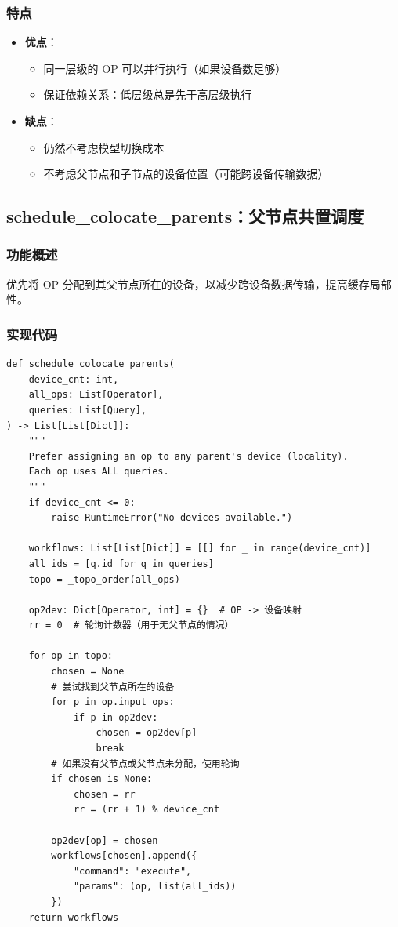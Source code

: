 \documentclass[12pt,a4paper]{article}
\begin{document}
\subsubsection{特点}

\begin{itemize}
    \item \textbf{优点}：
    \begin{itemize}
        \item 同一层级的 OP 可以并行执行（如果设备数足够）
        \item 保证依赖关系：低层级总是先于高层级执行
    \end{itemize}
    \item \textbf{缺点}：
    \begin{itemize}
        \item 仍然不考虑模型切换成本
        \item 不考虑父节点和子节点的设备位置（可能跨设备传输数据）
    \end{itemize}
\end{itemize}

\subsection{schedule\_colocate\_parents：父节点共置调度}

\subsubsection{功能概述}

优先将 OP 分配到其父节点所在的设备，以减少跨设备数据传输，提高缓存局部性。

\subsubsection{实现代码}

\begin{lstlisting}
def schedule_colocate_parents(
    device_cnt: int,
    all_ops: List[Operator],
    queries: List[Query],
) -> List[List[Dict]]:
    """
    Prefer assigning an op to any parent's device (locality).
    Each op uses ALL queries.
    """
    if device_cnt <= 0:
        raise RuntimeError("No devices available.")
    
    workflows: List[List[Dict]] = [[] for _ in range(device_cnt)]
    all_ids = [q.id for q in queries]
    topo = _topo_order(all_ops)
    
    op2dev: Dict[Operator, int] = {}  # OP -> 设备映射
    rr = 0  # 轮询计数器（用于无父节点的情况）
    
    for op in topo:
        chosen = None
        # 尝试找到父节点所在的设备
        for p in op.input_ops:
            if p in op2dev:
                chosen = op2dev[p]
                break
        # 如果没有父节点或父节点未分配，使用轮询
        if chosen is None:
            chosen = rr
            rr = (rr + 1) % device_cnt
        
        op2dev[op] = chosen
        workflows[chosen].append({
            "command": "execute",
            "params": (op, list(all_ids))
        })
    return workflows
\end{lstlisting}
\end{document}
